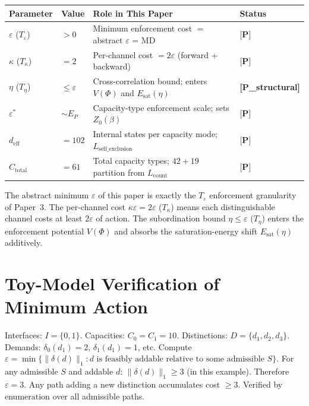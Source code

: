 \documentclass[11pt]{article}
\newcommand{\epitag}[1]{\textbf{[#1]}}
\theoremstyle{definition}
\begin{document}
\begin{center}
\begin{tabular}{@{}llll@{}}
\toprule
\textbf{Parameter} & \textbf{Value} & \textbf{Role in This Paper} & \textbf{Status} \\ \midrule
$\varepsilon$ ($T_\varepsilon$) & $> 0$ & Minimum enforcement cost $=$ abstract $\varepsilon$ = MD & $\epitag{P}$ \\
$\kappa$ ($T_\kappa$) & $= 2$ & Per-channel cost $= 2\varepsilon$ (forward + backward) & $\epitag{P}$ \\
$\eta$ ($T_\eta$) & $\le \varepsilon$ & Cross-correlation bound; enters $V(\Phi)$ and $E_{\mathrm{sat}}(\eta)$ & \epitag{P\_structural} \\
$\varepsilon^*$ & $\sim E_P$ & Capacity-type enforcement scale; sets $Z_0(\beta)$ & $\epitag{P}$ \\
$d_{\mathrm{eff}}$ & $= 102$ & Internal states per capacity mode; $L_{\mathrm{self\_exclusion}}$ & $\epitag{P}$ \\
$C_{\mathrm{total}}$ & $= 61$ & Total capacity types; $42 + 19$ partition from $L_{\mathrm{count}}$ & $\epitag{P}$ \\
\bottomrule
\end{tabular}
\end{center}

The abstract minimum $\varepsilon$ of this paper is exactly the $T_\varepsilon$ enforcement granularity of Paper~3.  The per-channel cost $\kappa \varepsilon = 2\varepsilon$ ($T_\kappa$) means each distinguishable channel costs at least $2\varepsilon$ of action.  The subordination bound $\eta \le \varepsilon$ ($T_\eta$) enters the enforcement potential $V(\Phi)$ and absorbs the saturation-energy shift $E_{\mathrm{sat}}(\eta)$ additively.

\section{Toy-Model Verification of Minimum Action}\label{app:toy}

Interfaces: $I = \{0, 1\}$.  Capacities: $C_0 = C_1 = 10$.  Distinctions: $D = \{d_1, d_2, d_3\}$.  Demands: $\delta_0(d_1) = 2$, $\delta_1(d_1) = 1$, etc.  Compute $\varepsilon = \min\{\|\delta(d)\|_1 : d \text{ is feasibly addable relative to some admissible } S\}$.  For any admissible $S$ and addable $d$: $\|\delta(d)\|_1 \ge 3$ (in this example).  Therefore $\varepsilon = 3$.  Any path adding a new distinction accumulates cost $\ge 3$.  Verified by enumeration over all admissible paths.
\end{document}
